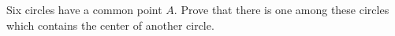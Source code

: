 Six circles have a common point $A$. Prove that there is one among these circles which contains the center of another circle.
